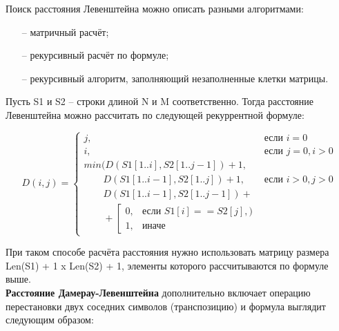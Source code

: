 \documentclass[12pt]{report}
\begin{document}
Поиск расстояния Левенштейна можно описать разными алгоритмами:
\begin{itemize}
\item[--] матричный расчёт;
\item[--] рекурсивный расчёт по формуле;
\item[--] рекурсивный алгоритм, заполняющий незаполненные клетки матрицы.
\end{itemize}

Пусть S1 и S2 – строки длиной N и M соответственно. Тогда расстояние Левенштейна можно рассчитать по следующей рекуррентной формуле:

\begin{equation}
D(i,j) = \left\{ \begin{array}{ll}
 j, & \textrm{$\mbox{если }i = 0$}\\
 i, & \textrm{$\mbox{если }j = 0, i > 0$}\\
min(D(S1[1..i], S2[1.. j - 1])+1,\\
\qquad D(S1[1..i - 1], S2[1..j]) + 1, &\textrm{$\mbox{если }i>0, j>0$}\\
\qquad D(S1[1..i - 1], S2[1..j - 1]) + \\
\qquad+\left[ 
	\begin{array}{ccc}
	0, & \textrm{$\mbox{если }S1[i] == S2[j],)$}\\
	1, & \textrm{иначе}
	\end{array} 
\right.
  \end{array} \right.
\end{equation}

При таком способе расчёта расстояния нужно использовать матрицу размера Len(S1) + 1 x Len(S2) + 1, элементы которого рассчитываются по формуле выше.\\



\textbf{Расстояние Дамерау-Левенштейна} дополнительно включает операцию перестановки двух соседних символов (транспозицию) и формула выглядит следующим образом:
\end{document}
